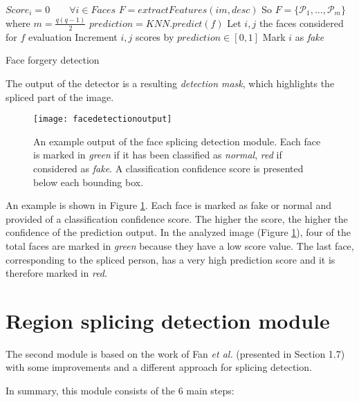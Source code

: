 \begin{algorithm}[!h]
\begin{algorithmic}[1]
\State $Score_i = 0 \qquad \forall i \in Faces$ 
\State $F = extractFeatures(im, desc)$
\State So $F = \{\mathcal{P}_1, \ldots, \mathcal{P}_m\} $ where $ m = \frac{q(q-1)}{2}$
\State $prediction = KNN.predict(f)$
\State Let $i, j$ the faces considered for $f$ evaluation
\State Increment $i, j$ scores by $prediction \in [0, 1]$
\EndFor
\EndFor
\EndFor
{}
\State Mark $i$ as \emph{fake}
\EndIf
\EndFor
\end{algorithmic}\caption{Face forgery detection}\label{alg:faceforgerydetection}
\end{algorithm}

The output of the detector is a resulting \emph{detection mask}, which highlights the spliced part of the image.

\begin{figure}[h!]
  \centering
    \texttt{[image: facedetectionoutput]}
    \caption{An example output of the face splicing detection module. Each face is marked in \emph{green} if it has been classified as \emph{normal}, \emph{red} if considered as \emph{fake}. A classification confidence score is presented below each bounding box.}
    \label{fig:facesplicingdetectionoutput}
\end{figure}

An example is shown in Figure \ref{fig:facesplicingdetectionoutput}. Each face is marked as fake or normal and provided of a classification confidence score. The higher the score, the higher the confidence of the prediction output. In the analyzed image (Figure \ref{fig:facesplicingdetectionoutput}), four of the total faces are marked in \emph{green} because they have a low score value. The last face, corresponding to the spliced person, has a very high prediction score and it is therefore marked in \emph{red}.

\section{Region splicing detection module}

The second module is based on the work of Fan \emph{et al.}\cite{fan2015image} (presented in Section 1.7) with some improvements and a different approach for splicing detection.

In summary, this module consists of the 6 main steps:

